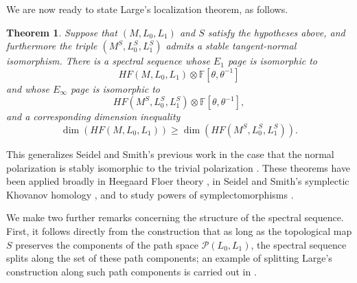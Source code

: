 \documentclass[11pt,reqno]{amsart}
\newtheorem{thm}{Theorem}[section]
\theoremstyle{definition}
\theoremstyle{remark}
\numberwithin{equation}{section}
\begin{document}
We are now ready to state Large's localization theorem, as follows.

\begin{thm}\cite{Large}\label{thm:localization} Suppose that $(M,L_0,L_1)$ and $S$ satisfy the hypotheses above, and furthermore the triple $(M^{S}, L_0^{S}, L_1^{S})$ admits a stable tangent-normal isomorphism. There is a spectral sequence whose $E_1$ page is isomorphic to \[ HF(M, L_0,L_1)\otimes \mathbb F[\theta, \theta^{-1}]\] and whose $E_{\infty}$ page is isomorphic to \[ HF(M^S, L_0^S, L_1^S)\otimes \mathbb F[\theta, \theta^{-1}],\] and a corresponding dimension inequality
%
\[ \dim \left( HF(M, L_0, L_1)\right) \geq \dim \left( HF\left(M^S, L_0^S, L_1^S\right)\right).\]
\end{thm}

This generalizes Seidel and Smith's previous work in the case that the normal polarization is stably isomorphic to the trivial polarization \cite[Theorem 1, Theorem 20]{SS10}. These theorems have been applied broadly in Heegaard Floer theory \cite{Hendricks12:dcov-localization, Hendricks:periodic-localization, HLS-equivariant, Boyle, Large, HLL:branched, Parikh}, in Seidel and Smith's symplectic Khovanov homology \cite{SS10, HMR:annular}, and to study powers of symplectomorphisms \cite{Hendricks:symplecto}. 

We make two further remarks concerning the structure of the spectral sequence. First, it follows directly from the construction that as long as the topological map $S$ preserves the components of the path space $\mathcal P(L_0, L_1)$, the spectral sequence splits along the set of these path components; an example of splitting Large's construction along such path components is carried out in \cite[Section 2.2]{HLL:branched}.  
\end{document}
